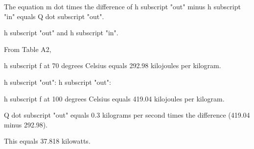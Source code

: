 The equation m dot times the difference of h subscript "out" minus h subscript "in" equals Q dot subscript "out".

h subscript "out" and h subscript "in".

From Table A2,

h subscript f at 70 degrees Celsius equals 292.98 kilojoules per kilogram.

h subscript "out": h subscript "out":

h subscript f at 100 degrees Celsius equals 419.04 kilojoules per kilogram.

Q dot subscript "out" equals 0.3 kilograms per second times the difference (419.04 minus 292.98).

This equals 37.818 kilowatts.